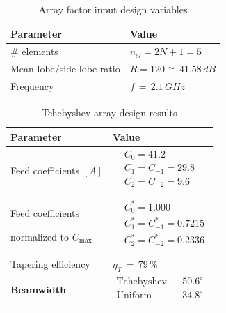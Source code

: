 \documentclass[10 pt,a4paper,twocolumn]{article}
\begin{document}
{\begin{table}[b!]
	\begin{center}
		{
		\selectfont	\begin{tabular}{|m{4cm}|m{4cm}|}
				\hline
				\cellcolor{deepsaffron}\textbf{Parameter} & \cellcolor{deepsaffron}\textbf{Value}\\
				\hline
				\# elements & $n_{el}=2N+1=5$\\
				\hline
				Mean lobe/side lobe
				ratio  & $R = 120 \cong\, 41.58\,dB$\\
				\hline 
				Frequency & $f\,=\,2.1\,GHz$\\
				\hline
		\end{tabular}}
		\caption{Array factor input design variables}
		\label{table:input_design_cheb}
	\end{center}
\end{table}
\begin{table}[b!] 
	\begin{center}
		{\selectfont
			\begin{tabular}{|m{4cm}|m{4cm}|}
				\hline
				\cellcolor{deepsaffron}\textbf{Parameter}
				& \cellcolor{deepsaffron}\textbf{Value} 
				\\
				\hline
				{Feed coefficients} $[A]$ &  \footnotesize{$\begin{aligned}
						&C_0 = 	41.2						\\
						&C_1=C_{-1} = 29.8 \\
						&C_{2}=C_{-2} = 9.6 \\
					\end{aligned}$}\\
				\hline 
				{Feed coefficients 
					
					normalized to $C_{\max}$} &  
				\footnotesize{$\begin{aligned}
						&C_0^* = 	1.000						\\
						& C_1^*=C_{-1}^* = 0.7215 \\
						& C_{2}^*=C_{-2}^*  =0.2336 \\
					\end{aligned}$} \\
				\hline
				{Tapering efficiency} & \footnotesize{$\eta_T\,=\,79\,\%$}\\ 
				\hline 
				\textbf{Beamwidth} & $ \begin{matrix}
					\text{Tchebyshev} & &50.6^\circ \\
					
					\text{Uniform} &  & 34.8^\circ\\
				\end{matrix} $ \\
				\hline 
		\end{tabular}}
		\caption{Tchebyshev array design results}
		\label{table:tcheby results}
	\end{center}
\end{table}
\indent 

}
\end{document}
